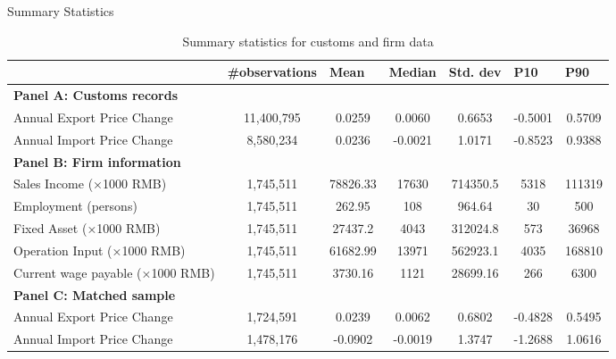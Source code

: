 \documentclass[10pt]{beamer}
\begin{document}
\begin{frame}{Summary Statistics}
    \begin{table}[htbp]
        \centering
	\caption{Summary statistics for customs and firm data}
	\label{summ.sample}
        \resizebox{0.95\columnwidth}{!}
        {
	\begin{tabular}{lcccccc}
		\toprule
            & \multicolumn{1}{l}{\#observations} & \multicolumn{1}{l}{Mean} & \multicolumn{1}{l}{Median} & \multicolumn{1}{l}{Std. dev} & \multicolumn{1}{l}{P10} & \multicolumn{1}{l}{P90} \\
            \midrule
		\textbf{Panel A: Customs records} &       &       &       &       &       &  \\
		Annual Export Price Change & 11,400,795 & 0.0259 & 0.0060 & 0.6653 & -0.5001 & 0.5709 \\
		Annual Import Price Change  & 8,580,234 & 0.0236 & -0.0021 & 1.0171 & -0.8523 & 0.9388 \\
		\midrule
		\textbf{Panel B: Firm information} &       &       &       &       &       &  \\
		Sales Income (×1000 RMB) & 1,745,511 & 78826.33 & 17630 & 714350.5 & 5318  & 111319 \\
		Employment (persons)& 1,745,511 & 262.95 & 108   & 964.64 & 30    & 500 \\
		Fixed Asset (×1000 RMB) & 1,745,511 & 27437.2 & 4043  & 312024.8 & 573   & 36968 \\
		Operation Input (×1000 RMB) & 1,745,511 & 61682.99 & 13971 & 562923.1 & 4035  & 168810 \\
		Current wage payable (×1000 RMB) & 1,745,511 & 3730.16 & 1121  & 28699.16 & 266   & 6300 \\
		\midrule
		\textbf{Panel C: Matched sample} &       &       &       &       &       &  \\
		Annual Export Price Change & 1,724,591 & 0.0239 & 0.0062 & 0.6802 & -0.4828 & 0.5495 \\
		Annual Import Price Change  & 1,478,176 & -0.0902 & -0.0019 & 1.3747 & -1.2688 & 1.0616 \\
		\bottomrule
	\end{tabular}
        }
    \end{table}
\end{frame}
\end{document}

